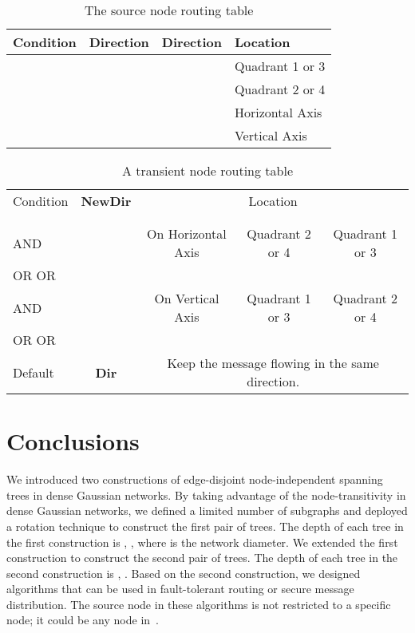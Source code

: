\documentclass[12pt,journal,compsoc,onecolumn,]{IEEEtran}
\begin{document}
{\begin{table}
\centering
{\footnotesize
\begin{tabular}
[c]{|l|l|l|l|}\hline
Condition &  Direction &  Direction &  Location\\\hline
 & \multicolumn{1}{|c|}{} &
\multicolumn{1}{|c|}{} & Quadrant 1 or 3\\\hline
 & \multicolumn{1}{|c|}{} &
\multicolumn{1}{|c|}{} & Quadrant 2 or 4\\\hline
 & \multicolumn{1}{|c|}{} & \multicolumn{1}{|c|}{} &
Horizontal Axis\\\hline
 & \multicolumn{1}{|c|}{} &
\multicolumn{1}{|c|}{} & Vertical Axis\\\hline
\end{tabular}
}\caption{The source node routing table}
\label{SourceRoutBlackRed}
\end{table}
 \begin{table}
\centering
{\footnotesize \begin{tabular}
[c]{|l|l|c|cc|}\hline
Condition & \textbf{NewDir} & \multicolumn{3}{|c|}{Location}\\
\cline{3-5}
&  &  & \multicolumn{2}{|c|}{}\\
\cline{4-5}
&  &  &  & \multicolumn{1}{|c|}{} \\
\hline
  AND &  & On Horizontal  Axis & Quadrant 2 or
4 & \multicolumn{1}{|c|}{Quadrant 1 or 3}\\
 OR  OR  &
\multicolumn{1}{|c|}{} &  &  & \multicolumn{1}{|c|}{}\\\hline
 AND & \multicolumn{1}{|c|}{} & On Vertical
Axis & Quadrant 1 or 3 & \multicolumn{1}{|c|}{Quadrant 2 or 4}\\
 OR  OR
 & \multicolumn{1}{|c|}{} &  &  &
\multicolumn{1}{|c|}{}\\\hline
Default & \multicolumn{1}{|c|}{\textbf{Dir}} & \multicolumn{3}{|c|}{
Keep the message flowing in the same direction.}\\\hline
\end{tabular}
}\caption{A transient node routing table}
\label{TransRoutBlackRed}
\end{table}
 
\newpage
\section{Conclusions\label{SectionConcl}\bigskip}

We introduced two constructions of edge-disjoint node-independent spanning trees in dense Gaussian networks.
By taking advantage of the node-transitivity in dense Gaussian networks,
we defined a limited number of subgraphs and deployed a rotation technique to construct the first pair of trees.
The depth of each tree in the first construction is , , where  is the network diameter.
We extended the first construction to construct the second pair of trees.
The depth of each tree in the second construction is , .
Based on the second construction, we designed algorithms that can be used in fault-tolerant routing or
secure message distribution.
The source node in these algorithms is not restricted to a specific node; it could be any node in~.

}
\end{document}
